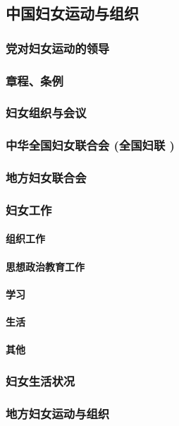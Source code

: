 \documentclass[UTF8]{../RepresentationUniverse}
\begin{document}
\subsection{中国妇女运动与组织}
    \subsubsection{党对妇女运动的领导}
    \subsubsection{章程、条例}
    \subsubsection{妇女组织与会议}
    \subsubsection{中华全国妇女联合会 (全国妇联 )}
    \subsubsection{地方妇女联合会}
    \subsubsection{妇女工作}
        \paragraph{组织工作}
        \paragraph{思想政治教育工作}
        \paragraph{学习}
        \paragraph{生活}
        \paragraph{其他}
        
    \subsubsection{妇女生活状况}
    \subsubsection{地方妇女运动与组织}
\end{document}

